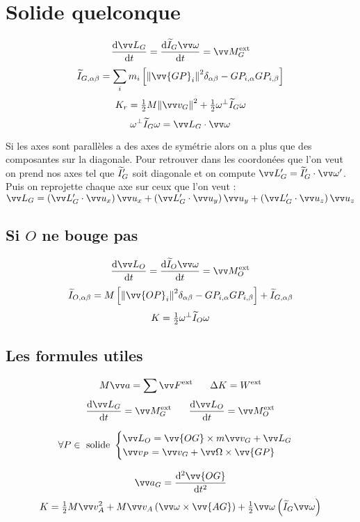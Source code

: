 \documentclass[../main.tex]{subfiles}
\begin{document}
\section{Solide quelconque}
\[
  \dv{\mc_G}{t}=\dv{\widetilde{I}_G\vian}{t}=\mf_G^{\exte}
\]
\[
  \ti_{G,\alpha\beta}=\sum_im_i\left[\norm{\vv{GP}_i}^2\delta_{\alpha\beta} - GP_{i,\alpha}GP_{i,\beta}\right]
\]
\[
  K_r = \tfrac{1}{2}M\norm{\vi_G}^2 + \tfrac{1}{2}\omega^{\bot}\ti_G\omega
\]
\[
  \omega^{\bot}\ti_G\omega=\mc_G\cdot\vian
\]

Si les axes sont parallèles a des axes de symétrie alors on a plus que des composantes sur la diagonale. Pour retrouver dans les coordonées que l'on veut on prend nos axes tel que \(\widetilde{I}_G'\) soit diagonale et on compute \(\mc_G'=\ti_G'\cdot\vian'\). Puis on reprojette chaque axe sur ceux que l'on veut : \(\mc_G=\left(\mc_G'\cdot\ux\right)\ux + \left(\mc_G'\cdot\uy\right)\uy + \left(\mc_G'\cdot\uz\right)\uz\)

\subsection{Si \(O\) ne bouge pas}
\[
  \dv{\mc_O}{t}=\dv{\widetilde{I}_O\vian}{t}=\mf_O^{\exte}
\]
\[
  \ti_{O,\alpha\beta}=M\left[\norm{\vv{OP}_i}^2\delta_{\alpha\beta} - GP_{i,\alpha}GP_{i,\beta}\right] + \ti_{G,\alpha\beta}
\]
\[
  K =\tfrac{1}{2}\omega^{\bot}\widetilde{I}_O\omega
\]
\subsection{Les formules utiles}
\[
  M\ac = \sum\F^{\exte} \phantom{text} \Delta K = W^{\exte}
\]
\[
  \dv{\mc_G}{t}=\mf_G^{\exte} \phantom{text} \dv{\mc_O}{t}=\mf_O^{\exte}
\]

\[ \forall P\in \text{ solide } 
  \begin{cases}
    \mc_O = \vv{OG}\times m\vi_G + \mc_G \\
    \vi_P = \vi_G + \Vian\times\vv{GP}
  \end{cases}
\]

\[
  \ac_G = \dv[2]{\vv{OG}}{t}
\]
\[
  K = \tfrac{1}{2}M\vi_A^2 + M\vi_A\left(\vian\times\vv{AG}\right) + \tfrac{1}{2}\vian\left(\ti_G\vian\right)
\]
\end{document}

